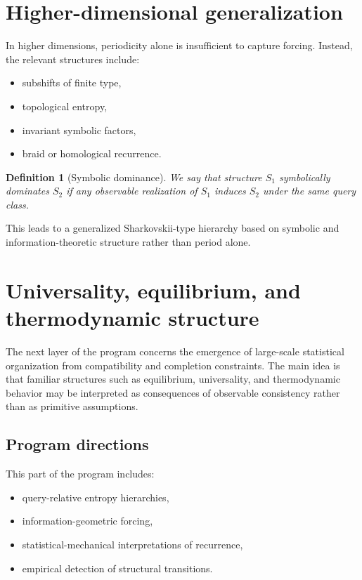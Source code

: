 \documentclass[11pt]{article}
\newtheorem{definition}{Definition}
\begin{document}
\section{Higher-dimensional generalization}

In higher dimensions, periodicity alone is insufficient to capture forcing.
Instead, the relevant structures include:
\begin{itemize}
\item subshifts of finite type,
\item topological entropy,
\item invariant symbolic factors,
\item braid or homological recurrence.
\end{itemize}

\begin{definition}[Symbolic dominance]
We say that structure $S_1$ symbolically dominates $S_2$ if any observable
realization of $S_1$ induces $S_2$ under the same query class.
\end{definition}

This leads to a generalized Sharkovskii-type hierarchy based on symbolic and
information-theoretic structure rather than period alone.

\section{Universality, equilibrium, and thermodynamic structure}

The next layer of the program concerns the emergence of large-scale
statistical organization from compatibility and completion constraints.
The main idea is that familiar structures such as equilibrium,
universality, and thermodynamic behavior may be interpreted as
consequences of observable consistency rather than as primitive
assumptions.

\subsection{Program directions}

This part of the program includes:
\begin{itemize}
\item query-relative entropy hierarchies,
\item information-geometric forcing,
\item statistical-mechanical interpretations of recurrence,
\item empirical detection of structural transitions.
\end{itemize}
\end{document}
